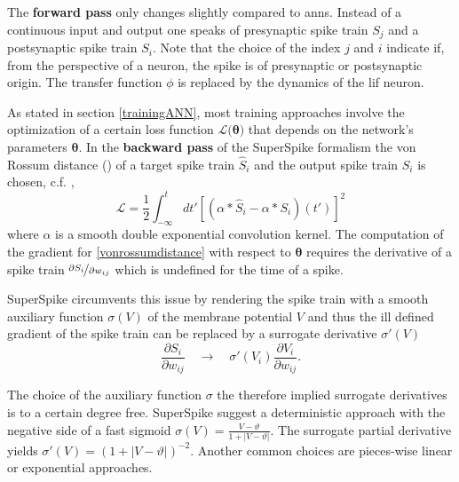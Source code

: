The \textbf{forward pass} only changes slightly compared to \glspl{ann}. Instead of a continuous input and output one speaks of presynaptic spike train $S_j$ and a postsynaptic spike train $S_i$. Note that the choice of the index $j$ and $i$ indicate if, from the perspective of a neuron, the spike is of presynaptic or postsynaptic origin. The transfer function $\phi$ is replaced by the dynamics of the \gls{lif} neuron.


As stated in section \ref{trainingANN}, most training approaches involve the optimization of a certain loss function $\mathcal{L(\mathbf{\theta)}}$ that depends on the network's parameters $\mathbf{\theta}$. In the \textbf{backward pass} of the SuperSpike formalism the von Rossum distance (\cite{rossum01novel}) of a target spike train $\hat{S}_i$ and the output spike train $S_i$ is chosen, c.f. \cite{zenke2018superspike},
\begin{equation}
\label{vonrossumdistance}
\mathcal{L} = \frac{1}{2} \int^t_{-\infty}dt' \left[\left(\alpha \ast \hat{S}_i - \alpha \ast S_i \right)(t')\right]^2
\end{equation}
where $\alpha$ is a smooth double exponential convolution kernel. The computation of the gradient for \ref{vonrossumdistance} with respect to $\mathbf{\theta}$ requires the derivative of a spike train $\nicefrac{\partial{S_i}}{\partial{w_{ij}}}$ which is undefined for the time of a spike. 

SuperSpike circumvents this issue by rendering the spike train with a smooth auxiliary function $\sigma(V)$ of the membrane potential $V$ and thus the ill defined gradient of the spike train can be replaced by a surrogate derivative $\sigma'(V)$
\begin{equation}
\frac{\partial S_i}{\partial w_{ij}} \quad \rightarrow \quad \sigma'(V_i)\frac{\partial V_i}{\partial w_{ij}}.
\end{equation}

The choice of the auxiliary function $\sigma$ the therefore implied surrogate derivatives is to a certain degree free. SuperSpike suggest a deterministic approach with the negative side of a fast sigmoid $\sigma(V) = \frac{V - \vartheta}{1 + |V - \vartheta|}$. The surrogate partial derivative yields $\sigma'(V) = \left(1 + |V - \vartheta|\right)^{-2}$. Another common choices are pieces-wise linear or exponential approaches.

